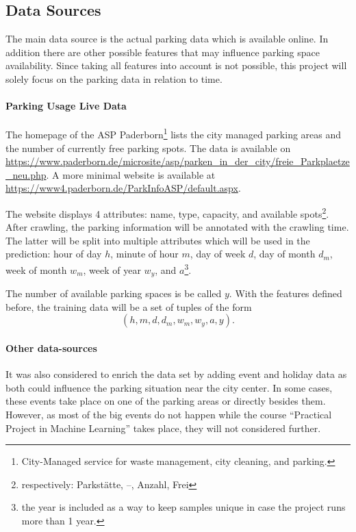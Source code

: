 \documentclass[journal,10pt]{IEEEtran}
\newcommand{\hod}{h}
\newcommand{\moh}{m}
\newcommand{\dow}{d}
\newcommand{\dom}{d_m}
\newcommand{\wom}{w_m}
\newcommand{\woy}{w_y}
\newcommand{\yyy}{a}
\begin{document}
\subsection{Data Sources}\label{data sources}
The main data source is the actual parking data which is available online. In addition there are other possible features that may influence parking space availability. Since taking all features into account is not possible, this project will solely focus on the parking data in relation to time. 

\paragraph{Parking Usage Live Data}
The homepage of the ASP Paderborn\footnote{City-Managed service for waste management, city cleaning, and parking.} lists the city managed parking areas and the number of currently free parking spots. 
The data is available on \url{https://www.paderborn.de/microsite/asp/parken_in_der_city/freie_Parkplaetze_neu.php}. A more minimal website is available at \url{https://www4.paderborn.de/ParkInfoASP/default.aspx}. 

The website displays 4 attributes: name, type, capacity, and available spots\footnote{respectively: Parkstätte, --, Anzahl, Frei}. After crawling, the parking information will be annotated with the crawling time. The latter will be split into multiple attributes which will be used in the prediction: hour of day \(\hod\), minute of hour \(\moh\), day of week \(\dow\), day of month \(\dom\), week of month \(\wom\), week of year \(\woy\), and \(\yyy\)\footnote{the year is included as a way to keep samples unique in case the project runs more than 1 year.}.

The number of available parking spaces is be called \(y\). With the features defined before, the training data will be a set of tuples of the form  
\[
(\hod, \moh, \dow, \dom, \wom, \woy, \yyy, y)\text{.}
\]

\paragraph{Other data-sources}
It was also considered to enrich the data set by adding event and holiday data as both could influence the parking situation near the city center. In some cases, these events take place on one of the parking areas or directly besides them. However, as most of the big events do not happen while the course ``Practical Project in Machine Learning'' takes place, they will not considered further.
\end{document}
